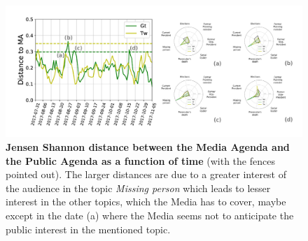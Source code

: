 \begin{figure}[h]
\includegraphics[width = \textwidth]{images/Fig4.pdf}
\caption{\textbf{Jensen Shannon distance between the Media Agenda and the Public Agenda as a function of time} (with the fences pointed out). The larger distances are due to a greater interest of the audience in the topic \emph{Missing person} which leads to lesser interest in the other topics, which the Media has to cover, maybe except in the date (a) where the Media seems not to anticipate the public interest in the mentioned topic.}
\label{fig:jensen_shannon_gt}
\end{figure}

